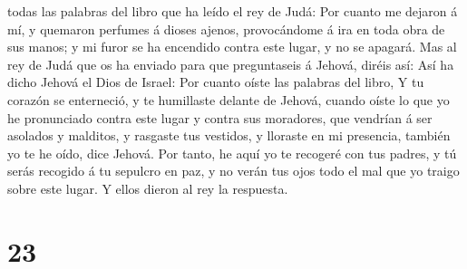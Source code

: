 todas las palabras del libro que ha leído el rey de Judá: 
Por cuanto me dejaron á mí, y quemaron perfumes á dioses ajenos,
provocándome á ira en toda obra de sus manos; y mi furor se ha encendido
contra este lugar, y no se apagará.  Mas al rey de Judá que
os ha enviado para que preguntaseis á Jehová, diréis así: Así ha dicho
Jehová el Dios de Israel: Por cuanto oíste las palabras del libro,
 Y tu corazón se enterneció, y te humillaste delante de
Jehová, cuando oíste lo que yo he pronunciado contra este lugar y contra
sus moradores, que vendrían á ser asolados y malditos, y rasgaste tus
vestidos, y lloraste en mi presencia, también yo te he oído, dice
Jehová.  Por tanto, he aquí yo te recogeré con tus padres,
y tú serás recogido á tu sepulcro en paz, y no verán tus ojos todo el
mal que yo traigo sobre este lugar. Y ellos dieron al rey la respuesta.

\hypertarget{section-22}{%
\section{23}\label{section-22}}


